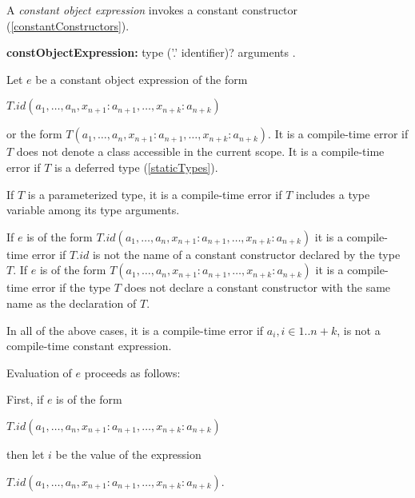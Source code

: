 \documentclass{article}
\begin{document}
\LMHash{}
A {\em constant object expression} invokes a constant constructor (\ref{constantConstructors}).

\begin{grammar}
{\bf constObjectExpression:}
\CONST{} type ('{\escapegrammar .}' identifier)? arguments
.
\end{grammar}

\LMHash{}
Let $e$ be a constant object expression of the form

\CONST{} $T.id(a_1, \ldots , a_n, x_{n+1}: a_{n+1}, \ldots , x_{n+k}: a_{n+k})$

or the form  \CONST{} $T(a_1, \ldots , a_n, x_{n+1}: a_{n+1}, \ldots , x_{n+k}: a_{n+k})$. It is a compile-time error if $T$ does not denote a class accessible in the current scope.  It is a compile-time error if $T$ is a deferred type (\ref{staticTypes}).


\LMHash{}
If $T$ is a parameterized type, it is a compile-time error if $T$ includes a type variable among its type arguments.

\LMHash{}
If $e$ is of the form \CONST{} $T.id(a_1, \ldots , a_n, x_{n+1}: a_{n+1}, \ldots , x_{n+k}: a_{n+k})$ it is a compile-time error if $T.id$ is not the name of a constant constructor declared by the type $T$. If $e$ is of the form  \CONST{} $T(a_1, \ldots , a_n, x_{n+1}: a_{n+1}, \ldots , x_{n+k}: a_{n+k})$ it is a compile-time error if the type $T$ does not declare a constant constructor with the same name as the declaration of $T$.

\LMHash{}
In all of the above cases, it is a compile-time error if $a_i,  i\in 1 .. n + k$, is not a compile-time constant expression.


\LMHash{}
Evaluation of $e$ proceeds as follows:

\LMHash{}
First, if $e$ is of the form

\CONST{} $T.id(a_1, \ldots , a_n, x_{n+1}: a_{n+1}, \ldots , x_{n+k}: a_{n+k})$

then let $i$ be the value of the expression

\NEW{} $T.id(a_1, \ldots , a_n, x_{n+1}: a_{n+1}, \ldots , x_{n+k}: a_{n+k})$.
\end{document}
